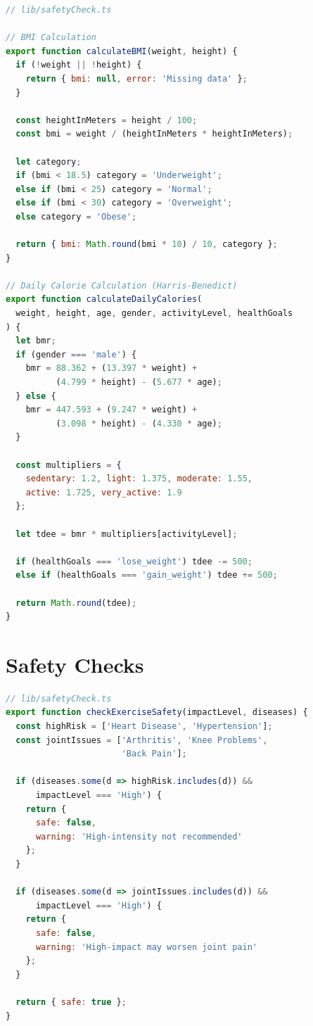 \begin{lstlisting}[language=JavaScript, caption=BMI and Calorie Calculations]
// lib/safetyCheck.ts

// BMI Calculation
export function calculateBMI(weight, height) {
  if (!weight || !height) {
    return { bmi: null, error: 'Missing data' };
  }
  
  const heightInMeters = height / 100;
  const bmi = weight / (heightInMeters * heightInMeters);
  
  let category;
  if (bmi < 18.5) category = 'Underweight';
  else if (bmi < 25) category = 'Normal';
  else if (bmi < 30) category = 'Overweight';
  else category = 'Obese';
  
  return { bmi: Math.round(bmi * 10) / 10, category };
}

// Daily Calorie Calculation (Harris-Benedict)
export function calculateDailyCalories(
  weight, height, age, gender, activityLevel, healthGoals
) {
  let bmr;
  if (gender === 'male') {
    bmr = 88.362 + (13.397 * weight) + 
          (4.799 * height) - (5.677 * age);
  } else {
    bmr = 447.593 + (9.247 * weight) + 
          (3.098 * height) - (4.330 * age);
  }
  
  const multipliers = {
    sedentary: 1.2, light: 1.375, moderate: 1.55,
    active: 1.725, very_active: 1.9
  };
  
  let tdee = bmr * multipliers[activityLevel];
  
  if (healthGoals === 'lose_weight') tdee -= 500;
  else if (healthGoals === 'gain_weight') tdee += 500;
  
  return Math.round(tdee);
}
\end{lstlisting}

\section{Safety Checks}

\begin{lstlisting}[language=JavaScript, caption=Exercise Safety Validation]
// lib/safetyCheck.ts
export function checkExerciseSafety(impactLevel, diseases) {
  const highRisk = ['Heart Disease', 'Hypertension'];
  const jointIssues = ['Arthritis', 'Knee Problems', 
                       'Back Pain'];
  
  if (diseases.some(d => highRisk.includes(d)) && 
      impactLevel === 'High') {
    return { 
      safe: false, 
      warning: 'High-intensity not recommended' 
    };
  }
  
  if (diseases.some(d => jointIssues.includes(d)) && 
      impactLevel === 'High') {
    return { 
      safe: false, 
      warning: 'High-impact may worsen joint pain' 
    };
  }
  
  return { safe: true };
}
\end{lstlisting}

